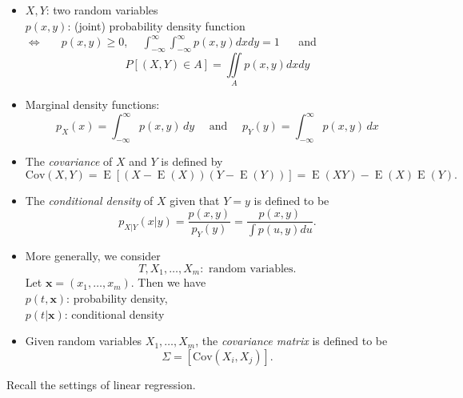\documentclass[
]{article}
\begin{document}
\begin{itemize}
\item
  \(X,Y\): two random variables\\
  \(p(x,y)\): (joint) probability density function\\
  \hspace*{0.333em}\hspace*{0.333em}\(\Longleftrightarrow\) ~~
  \(p(x,y) \ge 0\),~~
  \(\int_{-\infty}^\infty \int_{-\infty}^\infty p(x,y) dx dy =1\) ~~ and
  \[ P[ (X,Y) \in A ]= \iint \limits_A p(x,y) dx dy \]
\item
  Marginal density functions:
  \[p_X(x)= \int_{-\infty}^\infty p(x,y) \, dy  \quad\text{ and } \quad p_Y(y)= \int_{-\infty}^\infty p(x,y) \, dx\]
\item
  The \emph{covariance} of \(X\) and \(Y\) is defined by
  \[ \mathrm{Cov}(X,Y)= \operatorname{E}[ (X-\operatorname{E}(X)) (Y-\operatorname{E}(Y))]=\operatorname{E}(XY) -\operatorname{E}(X)\operatorname{E}(Y) .\]
\item
  The \emph{conditional density} of \(X\) given that \(Y=y\) is defined
  to be
  \[ p_{X|Y}(x|y)= \frac {p(x,y)}{p_Y(y)}= \frac {p(x,y)}{\int p(u,y)du} .\]
\item
  More generally, we consider
  \[ T,X_1, \dots, X_m: \text{ random variables}. \] Let
  \({\boldsymbol{x}}=(x_1, \dots , x_m)\). Then we have\\
  \(p(t,{\boldsymbol{x}})\): probability density, ~~\\
  \(p(t|{\boldsymbol{x}})\): conditional density
\item
  Given random variables \(X_1, \dots , X_m\), the \emph{covariance
  matrix} is defined to be \[ \Sigma = [ \mathrm{Cov}(X_i, X_j) ]. \]
\end{itemize}

Recall the settings of linear regression.
\end{document}
